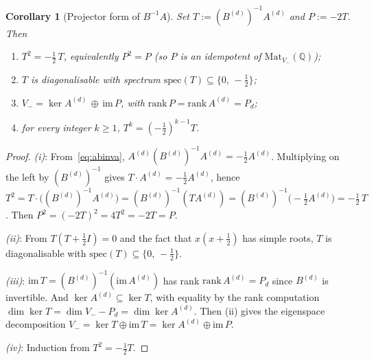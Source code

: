 \documentclass{amsart}
\newtheorem{corollary}[theorem]{Corollary}
\theoremstyle{definition}
\theoremstyle{remark}
\begin{document}
\begin{corollary}[Projector form of $B^{-1} A$]
\label{cor:projector-BinvA}
Set $T := (B^{(d)})^{-1} A^{(d)}$ and $P := -2 T$.  Then
\begin{enumerate}
\item[\textup{(i)}] $T^2 = -\tfrac12\, T$, equivalently
      $P^2 = P$ \textup{(}so $P$ is an idempotent of
      $\mathrm{Mat}_{V_-}(\mathbb Q)$\textup{)};
\item[\textup{(ii)}] $T$ is diagonalisable with spectrum
      $\mathrm{spec}(T) \subseteq \{0,\, -\tfrac12\}$;
\item[\textup{(iii)}] $V_- = \ker A^{(d)} \,\oplus\, \mathrm{im}\,P$,
      with $\mathrm{rank}\,P = \mathrm{rank}\,A^{(d)} = P_d$;
\item[\textup{(iv)}] for every integer $k \ge 1$,
      $T^k = (-\tfrac12)^{k-1} T$.
\end{enumerate}
\end{corollary}

\begin{proof}
\textit{(i)}: From~\eqref{eq:abinva},
$A^{(d)} (B^{(d)})^{-1} A^{(d)} = -\tfrac12 A^{(d)}$.
Multiplying on the left by $(B^{(d)})^{-1}$ gives
$T \cdot A^{(d)} = -\tfrac12 A^{(d)}$, hence
$T^2 = T \cdot \bigl((B^{(d)})^{-1} A^{(d)}\bigr)
     = (B^{(d)})^{-1} (T A^{(d)})
     = (B^{(d)})^{-1} \bigl(-\tfrac12 A^{(d)}\bigr)
     = -\tfrac12\, T$.
Then $P^2 = (-2 T)^2 = 4 T^2 = -2 T = P$.

\textit{(ii)}: From $T(T + \tfrac12 I) = 0$ and the fact that
$x(x + \tfrac12)$ has simple roots, $T$ is diagonalisable with
$\mathrm{spec}(T) \subseteq \{0,\, -\tfrac12\}$.

\textit{(iii)}: $\mathrm{im}\,T = (B^{(d)})^{-1}(\mathrm{im}\,A^{(d)})$
has rank $\mathrm{rank}\,A^{(d)} = P_d$ since $B^{(d)}$ is
invertible.  And $\ker A^{(d)} \subseteq \ker T$, with equality
by the rank computation $\dim \ker T = \dim V_- - P_d =
\dim \ker A^{(d)}$.  Then (ii) gives the eigenspace
decomposition $V_- = \ker T \oplus \mathrm{im}\,T = \ker A^{(d)}
\oplus \mathrm{im}\,P$.

\textit{(iv)}: Induction from $T^2 = -\tfrac12 T$.
\end{proof}
\end{document}
